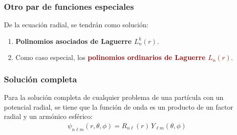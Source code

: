 \documentclass[12pt]{beamer}
\begin{document}
\begin{frame}
\frametitle{Otro par de funciones especiales}
De  la ecuación radial, se tendrán como solución:
\begin{enumerate}[<+->]
\item \textbf{\textcolor{bole}{Polinomios asociados de Laguerre $L_{n}^{k} (r)$}}.
\item Como caso especial, los \textbf{\textcolor{darkred}{polinomios ordinarios de Laguerre $L_{n} (r)$}}.
\end{enumerate}
\end{frame}
\begin{frame}
\frametitle{Solución completa}
Para la solución completa de cualquier problema de una partícula con un potencial radial, se tiene que la función de onda es un producto de un factor radial y un armónico esférico:
\pause
\begin{align*}
\psi_{n \ell m} (r, \theta, \phi) = R_{n \ell} (r) \, Y_{\ell m} (\theta, \phi)
\end{align*}
\end{frame}
\end{document}
